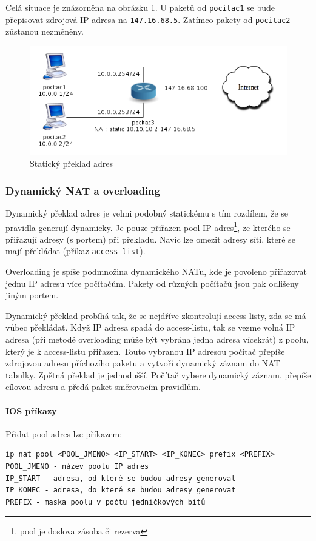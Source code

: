 Celá situace je znázorněna na obrázku \ref{fig:nat1}. U paketů od \verb|pocitac1| se bude přepisovat zdrojová IP adresa na \verb|147.16.68.5|. Zatímco pakety od \verb|pocitac2| zůstanou nezměněny.

\begin{figure}[h]
\begin{center}
\includegraphics[width=12cm]{figures/nat1}
\caption{Statický překlad adres}
\label{fig:nat1}
\end{center}
\end{figure}

\newpage


\subsubsection{Dynamický NAT a overloading}
Dynamický překlad adres je velmi podobný statickému s tím rozdílem, že se pravidla generují dynamicky. Je pouze přiřazen pool IP adres\footnote{pool je doslova zásoba či rezerva}, ze kterého se přiřazují adresy (s portem) při překladu. Navíc lze omezit adresy sítí, které se mají překládat (příkaz \verb|access-list|).

Overloading je spíše podmnožina dynamického NATu, kde je povoleno přiřazovat jednu IP adresu více počítačům. Pakety od různých počítačů jsou pak odlišeny jiným portem.

Dynamický překlad probíhá tak, že se nejdříve zkontrolují access-listy, zda se má vůbec překládat. Když IP adresa spadá do access-listu, tak se vezme volná IP adresa (při metodě overloading může být vybrána jedna adresa vícekrát) z poolu, který je k access-listu přiřazen. Touto vybranou IP adresou počítač přepíše zdrojovou adresu příchozího paketu a vytvoří dynamický záznam do NAT tabulky. Zpětná překlad je jednodušší. Počítač vybere dynamický záznam, přepíše cílovou adresu a předá paket směrovacím pravidlům.

\paragraph{IOS příkazy}
Přidat pool adres lze příkazem:
\begin{verbatim}
ip nat pool <POOL_JMENO> <IP_START> <IP_KONEC> prefix <PREFIX>
POOL_JMENO - název poolu IP adres
IP_START - adresa, od které se budou adresy generovat
IP_KONEC - adresa, do které se budou adresy generovat
PREFIX - maska poolu v počtu jedničkových bitů
\end{verbatim} 

